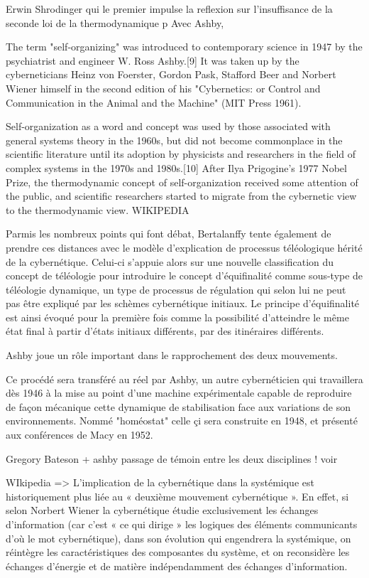  Erwin Shrodinger qui le premier impulse la reflexion sur l'insuffisance de la seconde loi de la thermodynamique p
Avec Ashby, 


The term "self-organizing" was introduced to contemporary science in 1947 by the psychiatrist and engineer W. Ross Ashby.[9] It was taken up by the cyberneticians Heinz von Foerster, Gordon Pask, Stafford Beer and Norbert Wiener himself in the second edition of his "Cybernetics: or Control and Communication in the Animal and the Machine" (MIT Press 1961).

Self-organization as a word and concept was used by those associated with general systems theory in the 1960s, but did not become commonplace in the scientific literature until its adoption by physicists and researchers in the field of complex systems in the 1970s and 1980s.[10] After Ilya Prigogine's 1977 Nobel Prize, the thermodynamic concept of self-organization received some attention of the public, and scientific researchers started to migrate from the cybernetic view to the thermodynamic view. WIKIPEDIA

Parmis les nombreux points qui font débat, Bertalanffy tente également de prendre ces distances avec le modèle d'explication de processus téléologique hérité de la cybernétique. Celui-ci s'appuie alors sur une nouvelle classification du concept de téléologie pour introduire le concept d'équifinalité comme sous-type de téléologie dynamique, un type de processus de régulation qui selon lui ne peut pas être expliqué par les schèmes cybernétique initiaux. Le principe d'équifinalité est ainsi évoqué pour la première fois comme la possibilité d'atteindre le même état final à partir d'états initiaux différents, par des itinéraires différents. \autocite[38]{Bertalanffy1973} \autocite[786-788]{Pouvreau2013}

Ashby joue un rôle important dans le rapprochement des deux mouvements.

Ce procédé sera transféré au réel par Ashby, un autre cybernéticien qui travaillera dès 1946 à la mise au point d'une machine expérimentale capable de reproduire de façon mécanique cette dynamique de stabilisation face aux variations de son environnements. Nommé "homéostat" celle çi sera construite en 1948, et présenté aux conférences de Macy en 1952.

Gregory Bateson + ashby passage de témoin entre les deux disciplines ! voir \cite{Pourveau}

WIkipedia => L'implication de la cybernétique dans la systémique est historiquement plus liée au « deuxième mouvement cybernétique ». En effet, si selon Norbert Wiener la cybernétique étudie exclusivement les échanges d'information (car c'est « ce qui dirige » les logiques des éléments communicants d'où le mot cybernétique), dans son évolution qui engendrera la systémique, on réintègre les caractéristiques des composantes du système, et on reconsidère les échanges d'énergie et de matière indépendamment des échanges d'information.

